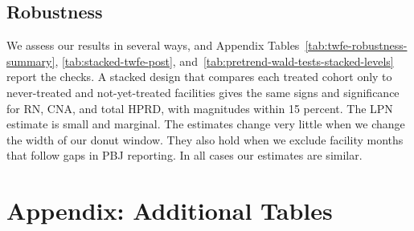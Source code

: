 \documentclass[12pt]{article}
\begin{document}

\FloatBarrier

\subsection{Robustness}

We assess our results in several ways, and Appendix Tables~\ref{tab:twfe-robustness-summary}, \ref{tab:stacked-twfe-post}, and~\ref{tab:pretrend-wald-tests-stacked-levels} report the checks. A stacked design that compares each treated cohort only to never-treated and not-yet-treated facilities gives the same signs and significance for RN, CNA, and total HPRD, with magnitudes within 15 percent. The LPN estimate is small and marginal. The estimates change very little when we change the width of our donut window. They also hold when we exclude facility months that follow gaps in PBJ reporting. In all cases our estimates are similar. 

\newpage




\clearpage
\onehalfspacing
\appendix
\renewcommand{\thetable}{A\arabic{table}}
\setcounter{table}{0}

\section*{Appendix: Additional Tables}












\end{document}
